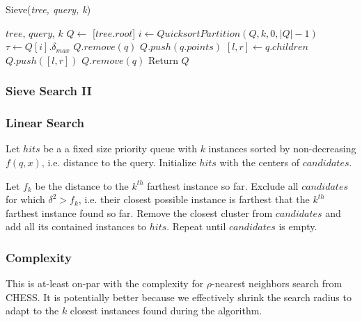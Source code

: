 \begin{algorithm} %
    \caption{Sieve(\emph{tree, query, k})} %
    \label{alg:sieve} %
    \begin{algorithmic}[6] %
        \REQUIRE $tree$, $query$, $k$
        \STATE $Q \leftarrow$ [$tree.root$]
            \STATE $i \leftarrow QuicksortPartition(Q, k, 0, |Q| - 1)$
            \STATE $\tau \leftarrow Q[i].\delta_{max}$
                    \STATE $Q.remove(q)$
                \ENDIF
            \ENDFOR
                    \STATE $Q.push(q.points)$
                \ELSE
                    \STATE $[l, r] \leftarrow q.children$
                    \STATE $Q.push([l, r])$   
                \ENDIF
                \STATE $Q.remove(q)$
            \ENDFOR 
        \ENDWHILE
        \STATE Return $Q$
    \end{algorithmic}
    \end{algorithm}

\subsubsection{Sieve Search II}
\label{subsubsec:methods:knn-search:sieve2}

\subsubsection{Linear Search}
\label{subsubsec:methods:knn-search:leaf-search}

Let $hits$ be a a fixed size priority queue with $k$ instances sorted by non-decreasing $f(q, x)$, i.e. distance to the query.
Initialize $hits$ with the centers of $candidates$.

Let $f_k$ be the distance to the $k^{th}$ farthest instance so far.
Exclude all $candidates$ for which $\delta^2 > f_k$, i.e. their closest possible instance is farthest that the $k^{th}$ farthest instance found so far.
Remove the closest cluster from $candidates$ and add all its contained instances to $hits$.
Repeat until $candidates$ is empty.

\subsubsection{Complexity}
\label{subsubsec:methods:knn-search:complexity}

This is at-least on-par with the complexity for $\rho$-nearest neighbors search from CHESS.
It is potentially better because we effectively shrink the search radius to adapt to the $k$ closest instances found during the algorithm.
